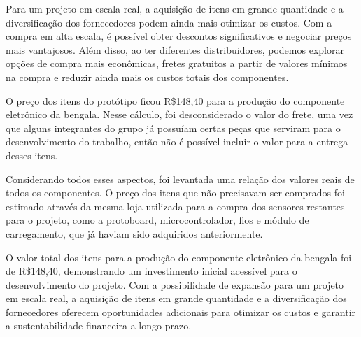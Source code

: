     Para um projeto em escala real, a aquisição de itens em grande quantidade e a diversificação dos fornecedores podem ainda mais otimizar os custos. Com a compra em alta escala, é possível obter descontos significativos e negociar preços mais vantajosos. Além disso, ao ter diferentes distribuidores, podemos explorar opções de compra mais econômicas, fretes gratuitos a partir de valores mínimos na compra e reduzir ainda mais os custos totais dos componentes.
    
    O preço dos itens do protótipo ficou R\$148,40 para a produção do componente eletrônico da bengala. Nesse cálculo, foi desconsiderado o valor do frete, uma vez que alguns integrantes do grupo já possuíam certas peças que serviram para o desenvolvimento do trabalho, então não é possível incluir o valor para a entrega desses itens.

    Considerando todos esses aspectos, foi levantada uma relação dos valores reais de todos os componentes. O preço dos itens que não precisavam ser comprados foi estimado através da mesma loja utilizada para a compra dos sensores restantes para o projeto, como a protoboard, microcontrolador, fios e módulo de carregamento, que já haviam sido adquiridos anteriormente. 

     O valor total dos itens para a produção do componente eletrônico da bengala foi de R\$148,40, demonstrando um investimento inicial acessível para o desenvolvimento do projeto. Com a possibilidade de expansão para um projeto em escala real, a aquisição de itens em grande quantidade e a diversificação dos fornecedores oferecem oportunidades adicionais para otimizar os custos e garantir a sustentabilidade financeira a longo prazo.

